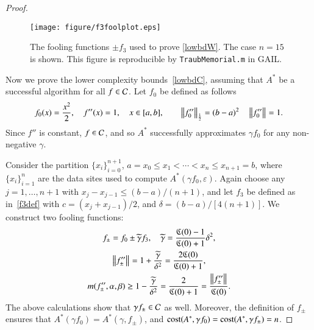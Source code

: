 \documentclass[review]{elsarticle}
\newcommand{\abstol}{\varepsilon}
\theoremstyle{definition}
\newcommand{\tgamma}{\widetilde{\gamma}}
\begin{document}
\begin{proof}
\begin{figure}
	\centering
	\texttt{[image: figure/f3foolplot.eps]}
	\caption{The fooling functions $\pm f_3$ used to prove \eqref{lowbdW}. The case
	$n=15$ is shown.  This figure is reproducible by \texttt{TraubMemorial.m}
	in GAIL.}
	\label{f3foolplot}
\end{figure}
	
Now we prove the lower complexity bounds~\eqref{lowbdC}, assuming that $A^*$ be a successful algorithm for all $f  \in \mathcal{C}$.  Let $f_0$ be defined as follows
\begin{equation}
\label{assumpfzero}
f_0(x) =\frac{x^2}{2}, \quad f''(x) = 1, \quad x \in [a,b], \qquad \norm[\frac12]{f_0''} = (b -a)^2  \quad \norm{f_0''} = 1.
\end{equation}
Since $f''$ is constant, $f \in \mathcal{C}$, and so $A^*$ successfully approximates $\gamma f_0$ for any non-negative $\gamma$.

Consider the partition $\{x_i\}_{i=0}^{n+1}$, $a=x_0 \le x_1 < \cdots < x_n \le x_{n+1} = b$, where $\{x_i\}_{i=1}^n$ are the data sites used to compute  $A^*(\gamma f_0,\abstol)$.    Again choose any $j=1, \ldots, n+1$ with $x_j-x_{j-1} \le (b-a)/(n+1)$, and let $f_3$ be defined as in~\eqref{f3def} with $c = (x_j+x_{j-1})/2$, and $\delta  = (b-a)/[4(n+1)]$. We construct two fooling functions:
\begin{gather*}
f_{\pm} = f_0 \pm \tgamma f_3, \quad \tgamma =\frac{\fC(0)-1}{\fC(0)+1}\delta^2, \\
\norm{f''_{\pm}} = 1+\frac{\tgamma}{\delta^2} = \frac{2\fC(0)}{\fC(0)+1} , \\
m(f''_{\pm},\alpha,\beta) \ge 1-\frac{\tgamma}{\delta^2} = \frac{2}{\fC(0)+1} = \frac{\norm{f''_{\pm}} }{\fC(0)}.
\end{gather*}
The above calculations show that $\gamma f_{\pm} \in \mathcal{C}$ as well.  Moreover, the definition of $f_{\pm}$ ensures that
$A^*(\gamma f_0) = A^*(\gamma,f_{\pm})$, and $\operatorname{cost}(A^*,\gamma f_0) = \operatorname{cost}(A^*,\gamma f_{\pm}) = n$.


\end{proof}
\end{document}
